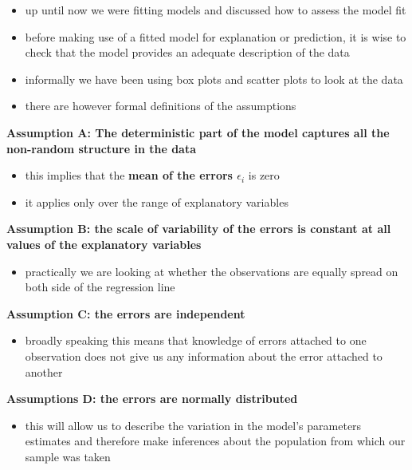 \documentclass[
]{book}
\providecommand{\tightlist}{%
  \setlength{\itemsep}{0pt}\setlength{\parskip}{0pt}}
\theoremstyle{definition}
\theoremstyle{definition}
\theoremstyle{definition}
\theoremstyle{remark}
\begin{document}
\begin{itemize}
\tightlist
\item
  up until now we were fitting models and discussed how to assess the model fit
\item
  before making use of a fitted model for explanation or prediction, it is wise to check that the model provides an adequate description of the data
\item
  informally we have been using box plots and scatter plots to look at the data
\item
  there are however formal definitions of the assumptions
\end{itemize}

\textbf{Assumption A: The deterministic part of the model captures all the non-random structure in the data}

\begin{itemize}
\tightlist
\item
  this implies that the \textbf{mean of the errors \(\epsilon_i\)} is zero
\item
  it applies only over the range of explanatory variables
\end{itemize}

\textbf{Assumption B: the scale of variability of the errors is constant at all values of the explanatory variables}

\begin{itemize}
\tightlist
\item
  practically we are looking at whether the observations are equally spread on both side of the regression line
\end{itemize}

\textbf{Assumption C: the errors are independent}

\begin{itemize}
\tightlist
\item
  broadly speaking this means that knowledge of errors attached to one observation does not give us any information about the error attached to another
\end{itemize}

\textbf{Assumptions D: the errors are normally distributed}

\begin{itemize}
\tightlist
\item
  this will allow us to describe the variation in the model's parameters estimates and therefore make inferences about the population from which our sample was taken
\end{itemize}
\end{document}
